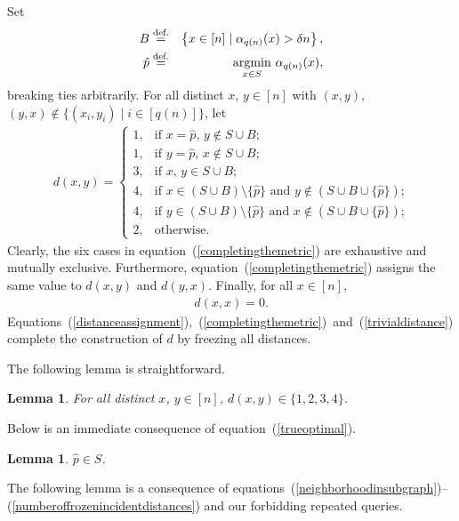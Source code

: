 \documentclass[letterpaper,12pt]{article}
\newtheorem{lemma}[theorem]{Lemma}
\begin{document}
Set
\begin{eqnarray}
B
&\stackrel{\text{def.}}{=}&
\left\{
x\in[n]\mid \alpha_{q(n)}(x)>\delta n
\right\},\label{badpoints}\\
\hat{p}
&\stackrel{\text{def.}}{=}&
\mathop{\rm argmin}_{x\in S}\, \alpha_{q(n)}(x),
\label{trueoptimal}
\end{eqnarray}
breaking ties arbitrarily.
For all distinct
$x$, $y\in[n]$
with $(x,y)$, $(y,x)\notin\{(x_i,y_i)\mid i\in[q(n)]\}$,
let
\begin{eqnarray}
d\left(x,y\right)
=
\left\{
\begin{array}{ll}
1, &\text{if $x=\hat{p}$, $y\notin S\cup B$;}\\
1, &\text{if $y=\hat{p}$, $x\notin S\cup B$;}\\
3, &\text{if $x$, $y\in S\cup B$;}\\
4, &\text{if $x\in (S\cup B)\setminus \{\hat{p}\}$ and $y\notin (S\cup B\cup\{\hat{p}\})$;}\\
4, &\text{if $y\in (S\cup B)\setminus \{\hat{p}\}$ and $x\notin (S\cup B\cup\{\hat{p}\})$;}\\
2, &\text{otherwise.}
\end{array}
\right.
\label{completingthemetric}
\end{eqnarray}
Clearly, the six cases in equation~(\ref{completingthemetric}) are
exhaustive and
mutually
exclusive.
Furthermore, equation~(\ref{completingthemetric}) assigns the same value
to $d(x,y)$ and $d(y,x)$.
Finally, for all $x\in[n]$,
\begin{eqnarray}
d\left(x,x\right)=0.\label{trivialdistance}
\end{eqnarray}
Equations~(\ref{distanceassignment}),~(\ref{completingthemetric})~and~(\ref{trivialdistance})
complete the construction of $d$ by freezing all distances.


The following lemma is straightforward.

\begin{lemma}\label{distancesarezeroto4}
For all distinct $x$, $y\in[n]$,
$d(x,y)\in\{1,2,3,4\}$.
\end{lemma}

Below is an immediate consequence of equation~(\ref{trueoptimal}).

\begin{lemma}\label{optimalisinpreservedregion}
$\hat{p}\in S$.
\end{lemma}

The following lemma is a consequence of
equations~(\ref{neighborhoodinsubgraph})--(\ref{numberoffrozenincidentdistances}) and
our
forbidding
repeated queries.
\end{document}
